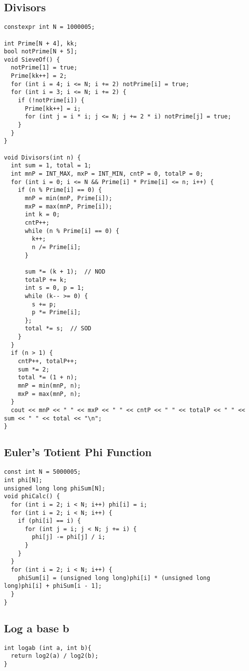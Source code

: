 \documentclass[10pt, a4paper]{article}
\begin{document}
\begin{multicols}{2}
\subsection{Divisors}
\begin{lstlisting}
constexpr int N = 1000005;

int Prime[N + 4], kk;
bool notPrime[N + 5];
void SieveOf() {
  notPrime[1] = true;
  Prime[kk++] = 2;
  for (int i = 4; i <= N; i += 2) notPrime[i] = true;
  for (int i = 3; i <= N; i += 2) {
    if (!notPrime[i]) {
      Prime[kk++] = i;
      for (int j = i * i; j <= N; j += 2 * i) notPrime[j] = true;
    }
  }
}

void Divisors(int n) {
  int sum = 1, total = 1;
  int mnP = INT_MAX, mxP = INT_MIN, cntP = 0, totalP = 0;
  for (int i = 0; i <= N && Prime[i] * Prime[i] <= n; i++) {
    if (n % Prime[i] == 0) {
      mnP = min(mnP, Prime[i]);
      mxP = max(mnP, Prime[i]);
      int k = 0;
      cntP++;
      while (n % Prime[i] == 0) {
        k++;
        n /= Prime[i];
      }

      sum *= (k + 1);  // NOD
      totalP += k;
      int s = 0, p = 1;
      while (k-- >= 0) {
        s += p;
        p *= Prime[i];
      };
      total *= s;  // SOD
    }
  }
  if (n > 1) {
    cntP++, totalP++;
    sum *= 2;
    total *= (1 + n);
    mnP = min(mnP, n);
    mxP = max(mnP, n);
  }
  cout << mnP << " " << mxP << " " << cntP << " " << totalP << " " << sum << " " << total << "\n";
}
\end{lstlisting}
\subsection{Euler's Totient Phi Function}
\begin{lstlisting}
const int N = 5000005;
int phi[N];
unsigned long long phiSum[N];
void phiCalc() {
  for (int i = 2; i < N; i++) phi[i] = i;
  for (int i = 2; i < N; i++) {
    if (phi[i] == i) {
      for (int j = i; j < N; j += i) {
        phi[j] -= phi[j] / i;
      }
    }
  }
  for (int i = 2; i < N; i++) {
    phiSum[i] = (unsigned long long)phi[i] * (unsigned long long)phi[i] + phiSum[i - 1];
  }
}
\end{lstlisting}
\subsection{Log a base b}
\begin{lstlisting}
int logab (int a, int b){
  return log2(a) / log2(b);
}
\end{lstlisting}


\end{multicols}
\end{document}
